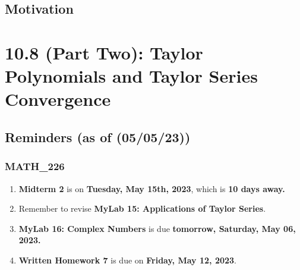 \section{Motivation}
\chapter{10.8 (Part Two): Taylor Polynomials and
Taylor Series Convergence }
\section{Reminders (as of (05/05/23))}
\subsection{MATH\_226}
\begin{enumerate}
  \item  \textbf{Midterm 2} is on \textbf{Tuesday, May 15th, 2023}, which is \textbf{10 days away.}
  \item Remember to revise \textbf{MyLab 15:
        Applications of Taylor Series}.
  \item \textbf{MyLab 16: Complex Numbers} is
        due \textbf{tomorrow, Saturday, May 06, 2023.}
  \item \textbf{Written Homework 7} is due on
        \textbf{Friday, May 12, 2023}.
\end{enumerate}
